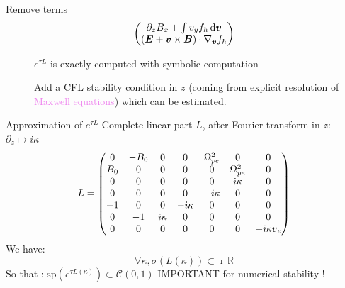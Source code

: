 \documentclass{beamer}
\newcommand{\cmark}{{\color{dgreen}\ding{52}}}
\newcommand{\xmark}{{\color{mred}\ding{55}}}
\newcommand{\Mvb}[1]{\boldsymbol{#1}}
\newcommand{\I}{\dot{\imath}}
\begin{document}
\begin{frame}{Remove terms}
$$\begin{pmatrix}
      \textcolor{violet}{ \partial_zB_x} + \int v_yf_h\dd{\Mvb{v}} \\
      (\Mvb{E}+\Mvb{v}\times\Mvb{B})\cdot\nabla_{\Mvb{v}}f_h
    \end{pmatrix}
  $$
  \begin{description}
    \item[\cmark] $e^{\tau L}$ is exactly computed with symbolic computation
    \item[\xmark] Add a CFL stability condition in $z$ (coming from explicit resolution of \textcolor{violet}{Maxwell equations}) which can be estimated.
  \end{description}
\end{frame}


\begin{frame}{Approximation of $e^{\tau L}$}
  Complete linear part $L$, after Fourier transform in $z$: $\partial_z\mapsto i\kappa$
  $$
    L = \begin{pmatrix}
      \gz & -B_0 & \gz                      &  \gz                      &  \Omega_{pe}^2            & \gz                      & \gz \\ 
      B_0 &  \gz & \gz                      &  \gz                      &  \gz                      & \Omega_{pe}^2            & \gz \\
      \gz &  \gz & \gz                      &  \gz                      &  \gz                      & \color{violet}{\I\kappa} & \gz \\ 
      \gz &  \gz & \gz                      &  \gz                      & \color{violet}{-\I\kappa} & \gz                      & \gz \\ 
      -1  &  \gz & \gz                      & \color{violet}{-\I\kappa} &  \gz                      & \gz                      & \gz \\ 
      \gz & -1   & \color{violet}{\I\kappa} &  \gz                      &  \gz                      & \gz                      & \gz \\ 
      \gz &  \gz & \gz                      &  \gz                      &  \gz                      & \gz                      & -\I\kappa v_z \\ 
    \end{pmatrix}
  $$
  We have:
  $$
    \forall \kappa, \sigma({L(\kappa)})\subset \I\,\mathbb{R}
  $$
  So that : $\text{sp}(e^{\tau L(\kappa)})\subset \mathcal{C}(0,1)$ \textcolor{mred}{IMPORTANT for numerical stability !}
\end{frame}
\end{document}
